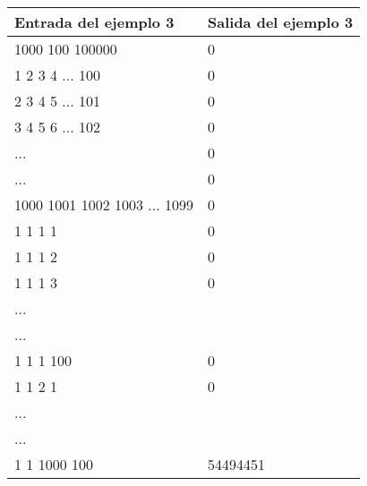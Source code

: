 \begin{center}
    \begin{tabular}{| l | l |}
    \hline
    Entrada del ejemplo 3 & Salida del ejemplo 3  \\ \hline
	1000 100 100000 & 0 \\
	1 2 3 4 ... 100 & 0 \\
	2 3 4 5 ... 101 & 0 \\
	3 4 5 6 ... 102 & 0 \\
	... & 0 \\
	... & 0 \\
	1000 1001 1002 1003 ... 1099 & 0 \\
	1 1 1 1 & 0 \\
	1 1 1 2 & 0 \\
	1 1 1 3 & 0 \\
	... & \\
	... & \\
	1 1 1 100 & 0 \\
	1 1 2 1 & 0 \\
	... & \\
	... & \\
	1 1 1000 100 & 54494451 \\
	\hline
    \end{tabular}
\end{center}
